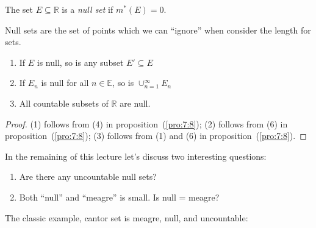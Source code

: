 \begin{definition}
The set $E\subseteq\mathbb{R}$ is a \emph{null set} if
$m^*(E)=0$.
\end{definition}
Null sets are the set of points which we can ``ignore'' when consider the length for sets.

\begin{corollary}
\begin{enumerate}
\item
If $E$ is null, so is any subset $E'\subseteq E$
\item
If $E_n$ is null for all $n\in\mathbb{E}$, so is $\cup_{n=1}^\infty E_n$
\item
All countable subsets of $\mathbb{R}$ are null.
\end{enumerate}
\end{corollary}
\begin{proof}
(1) follows from (4) in proposition~(\ref{pro:7:8});
(2) follows from (6) in proposition~(\ref{pro:7:8});
(3) follows from (1) and (6) in proposition~(\ref{pro:7:8}).
\end{proof}

In the remaining of this lecture let's discuss two interesting questions:
\begin{enumerate}
\item
Are there any uncountable null sets?
\item
Both ``null'' and ``meagre'' is small.
Is null = meagre?
\end{enumerate}
The classic example, cantor set is meagre, null, and uncountable:

